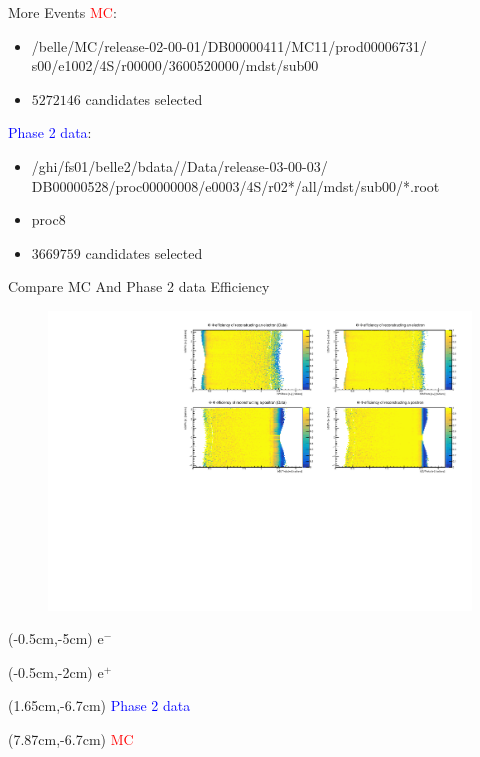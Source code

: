 \documentclass[10pt]{beamer}
\begin{document}
\begin{frame}{More Events}
	\textcolor{red}{MC}:
	\begin{itemize}
	
		\item /belle/MC/release-02-00-01/DB00000411/MC11/prod00006731/
		s00/e1002/4S/r00000/3600520000/mdst/sub00
		\item $ 5272146$ candidates selected
	\end{itemize}
	\textcolor{blue}{Phase 2 data}:
	\begin{itemize}
		\item /ghi/fs01/belle2/bdata//Data/release-03-00-03/
		DB00000528/proc00000008/e0003/4S/r02*/all/mdst/sub00/*.root
		\item proc8
		\item $3669759$ candidates selected 
	\end{itemize}

\end{frame}









\begin{frame}{Compare MC And Phase 2 data Efficiency}
	\begin{figure}
		\centering
		\includegraphics[width=\textwidth]{Plots/Eff/TPMCData}
	\end{figure}

	\begin{textblock*}{0.3\textwidth}(-0.5cm,-5cm)
	$\textrm{e}^-$
\end{textblock*}
\begin{textblock*}{0.3\textwidth}(-0.5cm,-2cm)
	$\textrm{e}^+$
\end{textblock*}


\begin{textblock*}{0.3\textwidth}(1.65cm,-6.7cm)
	\textcolor{blue}{Phase 2 data}
\end{textblock*}


\begin{textblock*}{0.3\textwidth}(7.87cm,-6.7cm)
	\textcolor{red}{MC}
\end{textblock*}



\end{frame}
\end{document}
